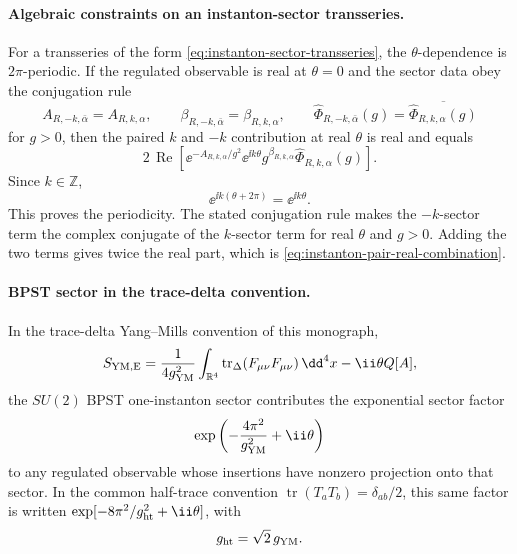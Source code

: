 \paragraph{Algebraic constraints on an instanton-sector transseries.}
For a transseries of the form
\eqref{eq:instanton-sector-transseries}, the \(\theta\)-dependence is
\(2\pi\)-periodic.  If the regulated observable is real at \(\theta=0\) and
the sector data obey the conjugation rule
\[
  A_{R,-k,\bar\alpha}=A_{R,k,\alpha},
  \qquad
  \beta_{R,-k,\bar\alpha}=\beta_{R,k,\alpha},
  \qquad
  \widehat\Phi_{R,-k,\bar\alpha}(g)
  =
  \overline{\widehat\Phi_{R,k,\alpha}(g)}
  \]
for \(g>0\), then the paired \(k\) and \(-k\) contribution at real \(\theta\)
is real and equals
\begin{equation}
  2\,\operatorname{Re}
  \left[
    \ee^{-A_{R,k,\alpha}/g^2}
    \ee^{\ii k\theta}
    g^{\beta_{R,k,\alpha}}
    \widehat\Phi_{R,k,\alpha}(g)
  \right].
  \label{eq:instanton-pair-real-combination}
\end{equation}
Since \(k\in\mathbb Z\),
\[
  \ee^{\ii k(\theta+2\pi)}=\ee^{\ii k\theta}.
\]
This proves the periodicity.  The stated conjugation rule makes the
\(-k\)-sector term the complex conjugate of the \(k\)-sector term for real
\(\theta\) and \(g>0\).  Adding the two terms gives twice the real part,
which is \eqref{eq:instanton-pair-real-combination}.

\paragraph{BPST sector in the trace-delta convention.}
In the trace-delta Yang--Mills convention of this monograph,
\begin{equation}
  S_{\rm YM,E}
  =
  \frac{1}{4g_{\rm YM}^2}
  \int_{\mathbb R^4}\operatorname{tr}_\Delta
  (F_{\mu\nu}F_{\mu\nu})\,\dd^4x
  -\ii\theta Q[A],
  \label{eq:bpst-action-trace-delta}
\end{equation}
the \(SU(2)\) BPST one-instanton sector contributes the exponential sector
factor
\begin{equation}
  \exp\left(-\frac{4\pi^2}{g_{\rm YM}^2}+\ii\theta\right)
  \label{eq:bpst-sector-factor-trace-delta}
\end{equation}
to any regulated observable whose insertions have nonzero projection onto
that sector.  In the common half-trace convention
\(\operatorname{tr}(T_aT_b)=\delta_{ab}/2\), this same factor is written
\(\exp[-8\pi^2/g_{\rm ht}^2+\ii\theta]\), with
\begin{equation}
  g_{\rm ht}=\sqrt2\,g_{\rm YM}.
  \label{eq:half-trace-trace-delta-coupling-relation}
\end{equation}

